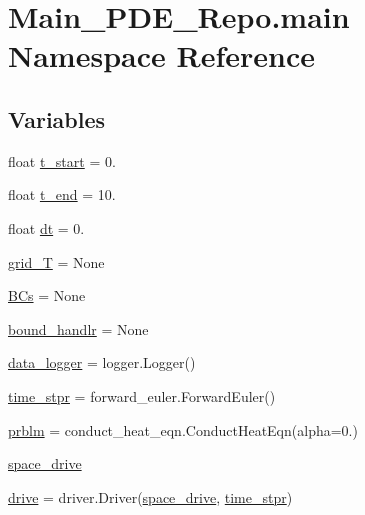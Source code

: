 \hypertarget{namespaceMain__PDE__Repo_1_1main}{}\section{Main\+\_\+\+P\+D\+E\+\_\+\+Repo.\+main Namespace Reference}
\label{namespaceMain__PDE__Repo_1_1main}
\subsection*{Variables}
\begin{DoxyCompactItemize}
\item 
float \hyperlink{namespaceMain__PDE__Repo_1_1main_a623833f709d5a8e70e4b8d306104018f}{t\+\_\+start} = 0.
\item 
float \hyperlink{namespaceMain__PDE__Repo_1_1main_aaa64ac17e939825c29e61b5cf0e55d09}{t\+\_\+end} = 10.
\item 
float \hyperlink{namespaceMain__PDE__Repo_1_1main_ad3b582748c81751902dd082c0fc4a57c}{dt} = 0.
\item 
\hyperlink{namespaceMain__PDE__Repo_1_1main_ae4ff7a8576629f56b86d396edb4e3d65}{grid\+\_\+T} = None
\item 
\hyperlink{namespaceMain__PDE__Repo_1_1main_abe5bfe982344188c2ad9d0a8068a01c4}{B\+Cs} = None
\item 
\hyperlink{namespaceMain__PDE__Repo_1_1main_a47a9833e51d57f5f1cbaf2e6b38274be}{bound\+\_\+handlr} = None
\item 
\hyperlink{namespaceMain__PDE__Repo_1_1main_af6467b085d01bd160fc83b50e93c0e54}{data\+\_\+logger} = logger.\+Logger()
\item 
\hyperlink{namespaceMain__PDE__Repo_1_1main_a87fde87043b4ff2798a7802cb61a3cbc}{time\+\_\+stpr} = forward\+\_\+euler.\+Forward\+Euler()
\item 
\hyperlink{namespaceMain__PDE__Repo_1_1main_a3868ee6e3a7637e20745a4aecbdd4002}{prblm} = conduct\+\_\+heat\+\_\+eqn.\+Conduct\+Heat\+Eqn(alpha=0.)
\item 
\hyperlink{namespaceMain__PDE__Repo_1_1main_a9450a1548e6c8d9316ce9ef5b053883e}{space\+\_\+drive}
\item 
\hyperlink{namespaceMain__PDE__Repo_1_1main_a9ef42bd76559c7db058c155f447f124b}{drive} = driver.\+Driver(\hyperlink{namespaceMain__PDE__Repo_1_1main_a9450a1548e6c8d9316ce9ef5b053883e}{space\+\_\+drive}, \hyperlink{namespaceMain__PDE__Repo_1_1main_a87fde87043b4ff2798a7802cb61a3cbc}{time\+\_\+stpr})
\end{DoxyCompactItemize}


